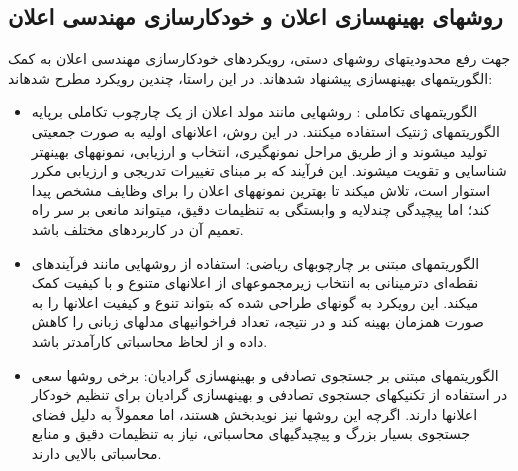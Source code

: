 \subsection{روش\/های بهینه\/سازی اعلان و خودکارسازی مهندسی اعلان}
جهت رفع محدودیت\/های روش\/های دستی، رویکردهای خودکارسازی مهندسی اعلان به کمک الگوریتم\/های بهینه\/سازی پیشنهاد شده\/اند. در این راستا، چندین رویکرد مطرح شده\/اند:
\begin{itemize}
	\item الگوریتم\/های تکاملی
	: 
	روش\/هایی مانند مولد اعلان
	\cite{PromptBreeder}
	 از یک چارچوب تکاملی برپایه الگوریتم\/های ژنتیک استفاده می\/کنند. در این روش، اعلان\/های اولیه به صورت جمعیتی تولید می\/شوند و از طریق مراحل نمونه\/گیری، انتخاب و ارزیابی، نمونه\/های بهینه\/تر شناسایی و تقویت می\/شوند. این فرآیند که بر مبنای تغییرات تدریجی و ارزیابی مکرر استوار است، تلاش می\/کند تا بهترین نمونه\/های اعلان را برای وظایف مشخص پیدا کند؛ اما پیچیدگی چندلایه و وابستگی به تنظیمات دقیق، می\/تواند مانعی بر سر راه تعمیم آن در کاربردهای مختلف باشد.
	\item الگوریتم\/های مبتنی بر چارچوب\/های ریاضی:
	استفاده از روش\/هایی مانند فرآیندهای نقطه‌ای دترمینانی
	\cite{DPP_for_ML}\cite{DPP}
	 به انتخاب زیرمجموعه\/ای از اعلان\/های متنوع و با کیفیت کمک می\/کند. این رویکرد به گونه\/ای طراحی شده که بتواند تنوع و کیفیت اعلان\/ها را به صورت همزمان بهینه کند و در نتیجه، تعداد فراخوانی\/های مدل\/های زبانی را کاهش داده و از لحاظ محاسباتی کارآمدتر باشد.
	 
	\item الگوریتم\/های مبتنی بر جستجوی تصادفی و بهینه\/سازی گرادیان:
	برخی روش\/ها سعی در استفاده از تکنیک\/های جستجوی تصادفی و بهینه\/سازی گرادیان برای تنظیم خودکار اعلان\/ها دارند. اگرچه این روش\/ها نیز نویدبخش هستند، اما معمولاً به دلیل فضای جستجوی بسیار بزرگ و پیچیدگی\/های محاسباتی، نیاز به تنظیمات دقیق و منابع محاسباتی بالایی دارند.
\end{itemize}


